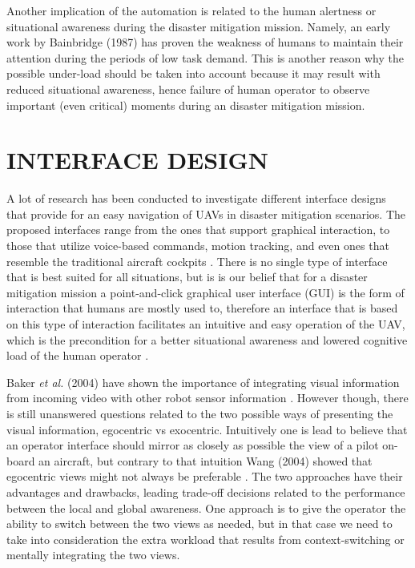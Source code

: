 \documentclass[12pt, letterpaper, oneside]{article}
\begin{document}
Another implication of the automation is related to the human alertness or situational awareness during the disaster mitigation mission. Namely, an early work by Bainbridge (1987) \cite{20} has proven the weakness of humans to maintain their attention during the periods of low task demand. This is another reason why the possible under-load should be taken into account because it may result with reduced situational awareness, hence failure of human operator to observe important (even critical) moments during an disaster mitigation mission. 

\section{INTERFACE DESIGN}
A lot of research has been conducted to investigate different interface designs that provide for an easy navigation of UAVs in disaster mitigation scenarios. The proposed interfaces range from the ones that support graphical interaction, to those that utilize voice-based commands, motion tracking, and even ones that resemble the traditional aircraft cockpits \cite{8, 23, 24, 25}. There is no single type of interface that is best suited for all situations, but is is our belief that for a disaster mitigation mission a point-and-click graphical user interface (GUI) is the form of interaction that humans are mostly used to, therefore an interface that is based on this type of interaction facilitates an intuitive and easy operation of the UAV, which is the precondition for a better situational awareness and lowered cognitive load of the human operator \cite{32}. 

Baker \emph{et al.} (2004) have shown the importance of integrating visual information from incoming video with other robot sensor information \cite{22}. However though, there is still unanswered questions related to the two possible ways of presenting the visual information, egocentric vs exocentric. Intuitively one is lead to believe that an operator interface should mirror as closely as possible the view of a pilot on-board an aircraft, but contrary to that intuition Wang (2004) showed that egocentric views might not always be preferable \cite{31}. The two approaches have their advantages and drawbacks, leading trade-off decisions related to the performance between the local and global awareness. One approach is to give the operator the ability to switch between the two views as needed, but in that case we need to take into consideration the extra workload that results from context-switching or mentally integrating the two views. 
\end{document}

